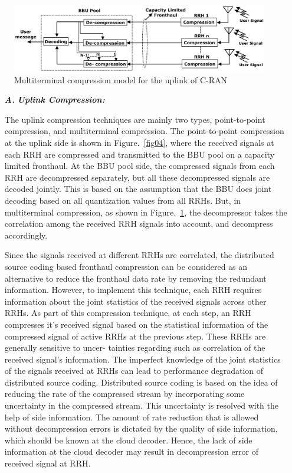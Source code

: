 \begin{figure}[H]
\centering
\includegraphics[scale=.56]{src/Figures/chap3/fig05.jpg}
\caption{Multiterminal compression model for the uplink of C-RAN}\label{fig05}
\end{figure}


\begin{multicols}{2}
\begin{itemize}

\item[{\textit{\textbf{ A.}}}] {\textit{\textbf{Uplink Compression:}}}

The uplink compression techniques are mainly two types, point-to-point compression, and multiterminal compression. The point-to-point compression at the uplink side is shown in Figure.~\ref{fig04}, where the received signals at each RRH are compressed and transmitted to the BBU pool on a capacity limited fronthaul. At the BBU pool side, the compressed signals from each RRH are decompressed separately, but all these decompressed signals are decoded jointly. This is based on the assumption that the BBU does joint decoding based on all quantization values from all RRHs. But, in multiterminal compression, as shown in Figure.~\ref{fig05}, the decompressor takes the correlation among the received RRH signals into account, and decompress accordingly.

Since the signals received at different RRHs are correlated, the distributed source coding based fronthaul compression can be considered as an alternative to reduce the fronthaul data rate by removing the redundant information. However, to implement this technique, each RRH requires information about the joint statistics of the received signals across other RRHs. As part of this compression technique, at each step, an RRH compresses it’s received signal based on the statistical information of the compressed signal of active RRHs at the previous step. These RRHs are generally sensitive to uncer- tainties regarding such as correlation of the received signal’s information. The imperfect knowledge of the joint statistics of the signals received at RRHs can lead to performance degradation of distributed source coding. Distributed source coding is based on the idea of reducing the rate of the compressed stream by incorporating some uncertainty in the compressed stream. This uncertainty is resolved with the help of side information. The amount of rate reduction that is allowed without decompression errors is dictated by the quality of side information, which should be known at the cloud decoder. Hence, the lack of side information at the cloud decoder may result in decompression error of received signal at RRH.


\end{itemize}
\end{multicols}
